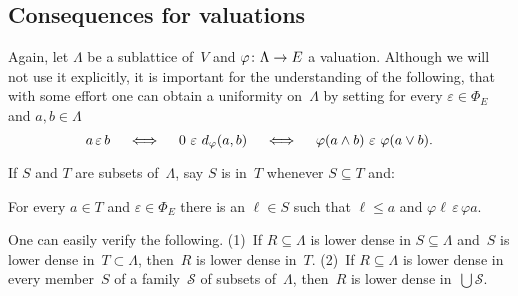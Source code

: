 \documentclass[main.tex]{subfiles}
\begin{document}
\subsection{Consequences for valuations}
Again,
let $\Lambda$ be a sublattice of~$V$ and $\varphi\colon \Lambda\rightarrow E$
a valuation.
Although we will not use it explicitly,
it is important for the understanding of the following,
that with some effort
one can obtain a uniformity on~$\Lambda$
by setting for every $\varepsilon\in\Phi_E$ and $a,b\in \Lambda$
\begin{equation*}
a\,\varepsilon\,b
\quad\iff\quad 
0 \ \varepsilon\ d_{\smash{\varphi}}(a,b)
\quad\iff\quad
\varphi(a\wedge b)\ \varepsilon\ \varphi(a\vee b)
\text{.}
\end{equation*}

If $S$ and $T$ are subsets of~$\Lambda$,
say $S$ is  in~$T$
whenever $S\subseteq T$ and:
\begin{center}
\begin{minipage}{0.8\textwidth}
For every $a\in T$ and $\varepsilon\in\Phi_E$
there is an $\ell\in S$
such that $\ell \leq a$ and $\varphi \ell\,\varepsilon\, \varphi a$.
\end{minipage}
\end{center}
One can easily verify the following.
\quad(1)\  If $R\subseteq \Lambda$ is lower dense in $S\subseteq \Lambda$
and~$S$ is lower dense in~$T\subset \Lambda$,
then~$R$ is lower dense in~$T$.
\quad(2)\  If $R\subseteq \Lambda$ 
is lower dense in every member~$S$ of a family~$\mathcal S$
of subsets of~$\Lambda$,
then~$R$ is lower dense in~$\bigcup \mathcal{S}$.
\end{document}
